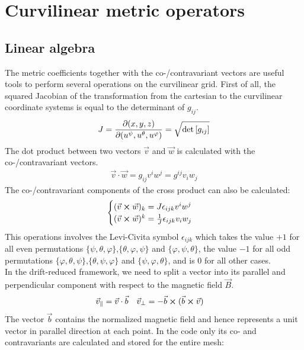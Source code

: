 \chapter{Curvilinear metric operators}
\label{app:CurvilinearMetric}



\section{Linear algebra}
\label{sec:app_linearAlgebra}

The metric coefficients together with the co-/contravariant vectors are useful tools to perform several operations on the curvilinear grid. First of all, the squared Jacobian of the transformation from the cartesian to the curvilinear coordinate systems is equal to the determinant of $g_{ij}$. 
\begin{align}
	J = \pdv{(x,y,z)}{(u^\psi, u^\theta, u^\varphi)} = \sqrt{\det\left[g_{ij}\right]} \label{eq:MetricJacobian}
\end{align}
The dot product between two vectors $\vec{v}$ and $\vec{w}$ is calculated with the co-/contravariant vectors.
\begin{align}
	\vec{v}\cdot\vec{w} = g_{ij}v^iw^j = g^{ij}v_iw_j \label{eq:MetricDotProduct}
\end{align}
The co-/contravariant components of the cross product can also be calculated: 
\begin{align}
	\begin{cases}
		(\vec{v} \cross \vec{w})_k = J\epsilon_{ijk}v^iw^j \\
		(\vec{v} \cross \vec{w})^k = \frac{1}{J}\epsilon_{ijk}v_iw_j
	\end{cases} \label{eq:MetricCrossProduct}
\end{align}
This operations involves the Levi-Civita symbol $\epsilon_{ijk}$ which takes the value $+1$ for all even permutations $\{\psi,\theta,\varphi\}$,$\{\theta,\varphi,\psi\}$ and $\{\varphi,\psi,\theta\}$, the value $-1$ for all odd permutations $\{\varphi,\theta,\psi\}$,$\{\theta,\psi,\varphi\}$ and $\{\psi,\varphi,\theta\}$, and is $0$ for all other cases. \\
In the drift-reduced framework, we need to split a vector into its parallel and perpendicular component with respect to the magnetic field $\vec{B}$.
\begin{align}
	\vec{v}_\parallel &= \vec{v}\cdot\vec{b} & \vec{v}_\perp &= -\vec{b}\cross (\vec{b}\cross\vec{v}) \label{eq:MetricParalPerpVecComponents}
\end{align}
The vector $\vec{b}$ contains the normalized magnetic field and hence represents a unit vector in parallel direction at each point. In the code only its co- and contravariants are calculated and stored for the entire mesh: 

